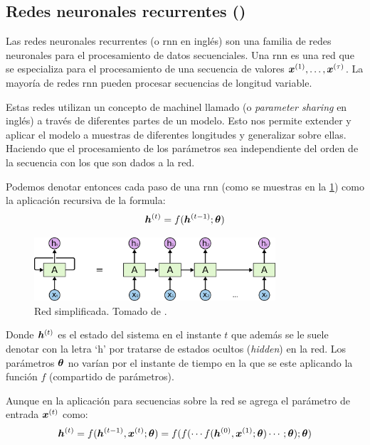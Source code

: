 \subsection{Redes neuronales recurrentes ()}
Las redes neuronales recurrentes (o \gls{rnn} en inglés) son una familia de redes neuronales para el procesamiento de datos secuenciales. Una \gls{rnn} es una red que se especializa para el procesamiento de una secuencia de valores ${\bm{x}}^{(1)}, \ldots, {\bm{x}}^{(\tau)}$. La mayoría de redes \gls{rnn} pueden procesar secuencias de longitud variable.

Estas redes utilizan un concepto de \gls{machinel} llamado  (o \textsl{parameter sharing} en inglés) a través de diferentes partes de un modelo. Esto nos permite extender y aplicar el modelo a muestras de diferentes longitudes y generalizar sobre ellas. Haciendo que el procesamiento de los parámetros sea independiente del orden de la secuencia con los que son dados a la red.

Podemos denotar entonces cada paso de una \gls{rnn} (como se muestras en la \cref{fig:rnn-classic-simple}) como la aplicación recursiva de la formula:
\begin{equation}
  {\bm{h}}^{(t)} = f({\bm{h}}^{(t-1)}; {\bm{\theta}})
\end{equation}

\begin{figure}[H]
  \centering
  \includegraphics[width=0.8\textwidth]{Figures/RNN-unrolled.png}
\decoRule
\caption[Red  simplificada]{Red  simplificada. Tomado de \cite{understanding-lstm}.}
\label{fig:rnn-classic-simple}
\end{figure}

Donde ${\bm{h}}^{(t)}$ es el estado del sistema en el instante $t$ que además se le suele denotar con la letra `h' por tratarse de estados ocultos (\textsl{hidden}) en la red. Los parámetros ${\bm{\theta}}$ no varían por el instante de tiempo en la que se este aplicando la función $f$ (compartido de parámetros).

Aunque en la aplicación para secuencias sobre la red se agrega el parámetro de entrada ${\bm{x}}^{(t)}$ como:
\begin{equation}
  {\bm{h}}^{(t)} = f({\bm{h}}^{(t-1)}, {\bm{x}}^{(t)} ; {\bm{\theta}}) = f(f(\cdots f({\bm{h}}^{(0)}, {\bm{x}}^{(1)}; {\bm{\theta}}) \cdots ; {\bm{\theta}}); {\bm{\theta}})
\end{equation}

